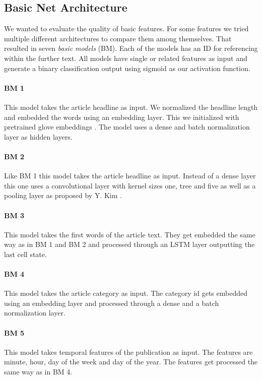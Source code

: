 \subsection{Basic Net Architecture}

We wanted to evaluate the quality of basic features. For some features we tried multiple different architectures to compare them among themselves. That resulted in seven \textit{basic models} (BM). Each of the models has an ID for referencing within the further text.
All models have single or related features as input and generate a binary classification output using sigmoid as our activation function.

\paragraph{BM 1} This model takes the article headline as input. We normalized the headline length and embedded the words using an embedding layer. This we initialized with pretrained glove embeddings \cite{pennington2014glove}. The model uses a dense and batch normalization layer as hidden layers.
\paragraph{BM 2} Like BM 1 this model takes the article headline as input. Instead of a dense layer this one uses a convolutional layer with kernel sizes one, tree and five as well as a pooling layer as proposed by Y. Kim \cite{kim2014convolutional}.
\paragraph{BM 3} This model takes the first words of the article text. They get embedded the same way as in BM 1 and BM 2 and processed through an LSTM layer outputting the last cell state.
\paragraph{BM 4} This model takes the article category as input. The category id gets embedded using an embedding layer and processed through a dense and a batch normalization layer.
\paragraph{BM 5} This model takes temporal features of the publication as input. The features are minute, hour, day of the week and day of the year. The features get processed the same way as in BM 4.
